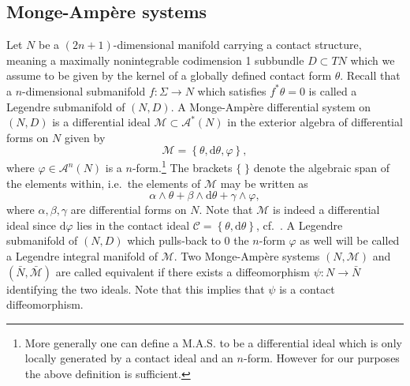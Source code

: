 \documentclass[11pt,letterpaper]{amsart}
\theoremstyle{definition}
\numberwithin{equation}{section}
\begin{document}
\subsection{{Monge-Amp\`ere } systems}
Let $N$ be a $(2n+1)$-dimensional manifold carrying a contact structure, meaning a maximally nonintegrable codimension 1 subbundle ${D} \subset TN$ which we assume to be given by the kernel of a globally defined contact form $\theta$. Recall that a $n$-dimensional submanifold $f: \Sigma \to N$ which satisfies $f^*\theta=0$ is called a Legendre submanifold of $(N,{D})$. A Monge-Amp\`ere differential system on $(N,{D})$ is a differential ideal $\mathcal{M} \subset \mathcal{A}^*(N)$ in the exterior algebra of differential forms on $N$ given by
$$
\mathcal{M}=\left\{\theta,{\mathrm{d}}\theta,\varphi\right\},
$$ 
where $\varphi \in \mathcal{A}^n(N)$ is a $n$-form.\footnote{More generally one can define a M.A.S. to be a differential ideal which is only locally generated by a contact ideal and an $n$-form. However for our purposes the above definition is sufficient.} The brackets $\{\;\}$ denote the algebraic span of the elements within, i.e.~the elements of $\mathcal{M}$ may be written as
$$
\alpha\wedge\theta+\beta\wedge {\mathrm{d}}\theta+\gamma\wedge \varphi,
$$
where $\alpha,\beta,\gamma$ are differential forms on $N$. Note that $\mathcal{M}$ is indeed a differential ideal since ${\mathrm{d}}\varphi$ lies in the contact ideal $\mathcal{C}=\left\{\theta,{\mathrm{d}}\theta\right\}$, cf.~\cite{MR1985469}. A Legendre submanifold of $(N,{D})$ which pulls-back to $0$ the $n$-form $\varphi$ as well will be called a Legendre integral manifold of $\mathcal{M}$. Two Monge-Amp\`ere systems $(N,\mathcal{M})$ and $(\bar{N},\bar{\mathcal{M}})$ are called equivalent if there exists a diffeomorphism $\psi : N \to \bar{N}$ identifying the two ideals. Note that this implies that $\psi$ is a contact diffeomorphism. 
\end{document}
